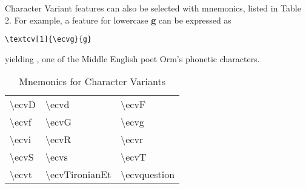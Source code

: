 \documentclass[12pt]{article}
\begin{document}
Character Variant features can also be selected with mnemonics, listed in Table 2. For example, a feature for
lowercase \textbf{g} can be expressed as

\begin{center}
{\verb|\textcv[1]{\ecvg}{g}|}
\end{center}

\noindent yielding \textbf{}, one of the Middle English poet Orm’s phonetic characters.

\begin{table}[ht]
    \centering
    \begin{tabular}{|l|l|l|}
    \hline
    \textbackslash ecvD & \textbackslash ecvd & \textbackslash ecvF\\

    \textbackslash ecvf & \textbackslash ecvG & \textbackslash ecvg\\

    \textbackslash ecvi & \textbackslash ecvR & \textbackslash ecvr\\

    \textbackslash ecvS & \textbackslash ecvs & \textbackslash ecvT\\

    \textbackslash ecvt & \textbackslash ecvTironianEt & \textbackslash ecvquestion\\
    \hline
\end{tabular}
\caption{Mnemonics for Character Variants}
\end{table}
\end{document}
